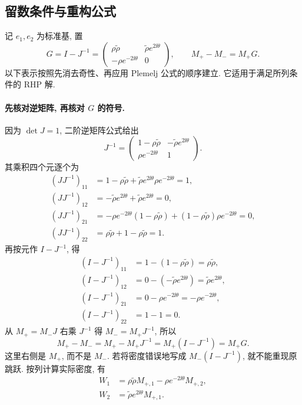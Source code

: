 \subsection{留数条件与重构公式}
记 $e_1,e_2$ 为标准基, 置
\begin{equation}\label{eq:Gdefinition}
G=I-J^{-1}=\begin{pmatrix}
\rho\widetilde\rho&\widetilde\rho e^{2\ii\theta}\\
-\rho e^{-2\ii\theta}&0
\end{pmatrix},\qquad M_+-M_-=M_+G.
\end{equation}
以下表示按照先消去奇性、再应用 Plemelj 公式的顺序建立\cite{ZhangFan2020,Fan2022}. 它适用于满足所列条件的 RHP 解.

\paragraph{先核对逆矩阵, 再核对 $G$ 的符号.}
因为 $\det J=1$, 二阶逆矩阵公式给出
\[
J^{-1}=\begin{pmatrix}
1-\rho\widetilde\rho&-\widetilde\rho e^{2\ii\theta}\\
\rho e^{-2\ii\theta}&1
\end{pmatrix}.
\]
其乘积四个元逐个为
\[
\begin{aligned}
(JJ^{-1})_{11}
&=1-\rho\widetilde\rho
+\widetilde\rho e^{2\ii\theta}\rho e^{-2\ii\theta}=1,\\
(JJ^{-1})_{12}
&=-\widetilde\rho e^{2\ii\theta}
+\widetilde\rho e^{2\ii\theta}=0,\\
(JJ^{-1})_{21}
&=-\rho e^{-2\ii\theta}(1-\rho\widetilde\rho)
+(1-\rho\widetilde\rho)\rho e^{-2\ii\theta}=0,\\
(JJ^{-1})_{22}
&=\rho\widetilde\rho+1-\rho\widetilde\rho=1.
\end{aligned}
\]
再按元作 $I-J^{-1}$, 得
\[
\begin{aligned}
(I-J^{-1})_{11}&=1-(1-\rho\widetilde\rho)=\rho\widetilde\rho,\\
(I-J^{-1})_{12}&=0-(-\widetilde\rho e^{2\ii\theta})
=\widetilde\rho e^{2\ii\theta},\\
(I-J^{-1})_{21}&=0-\rho e^{-2\ii\theta}
=-\rho e^{-2\ii\theta},\\
(I-J^{-1})_{22}&=1-1=0.
\end{aligned}
\]
从 $M_+=M_-J$ 右乘 $J^{-1}$ 得 $M_-=M_+J^{-1}$, 所以
\[
M_+-M_-=M_+-M_+J^{-1}=M_+(I-J^{-1})=M_+G.
\]
这里右侧是 $M_+$, 而不是 $M_-$.
若将密度错误地写成 $M_-(I-J^{-1})$, 就不能重现原跳跃.
按列计算实际密度, 有
\[
\begin{aligned}
W_1
&=\rho\widetilde\rho M_{+,1}
-\rho e^{-2\ii\theta}M_{+,2},\\
W_2
&=\widetilde\rho e^{2\ii\theta}M_{+,1}.
\end{aligned}
\]
